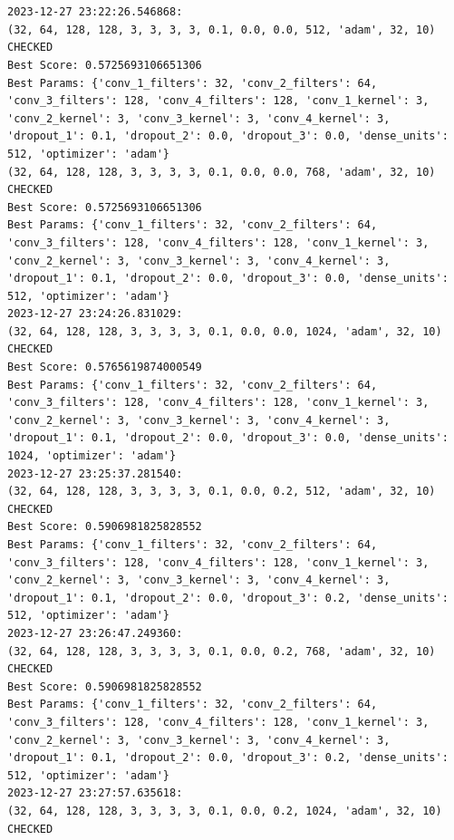 
\section{}
\label{app:appendix-a}

\begin{verbatim}
2023-12-27 23:22:26.546868:
(32, 64, 128, 128, 3, 3, 3, 3, 0.1, 0.0, 0.0, 512, 'adam', 32, 10) CHECKED
Best Score: 0.5725693106651306
Best Params: {'conv_1_filters': 32, 'conv_2_filters': 64, 'conv_3_filters': 128, 'conv_4_filters': 128, 'conv_1_kernel': 3, 'conv_2_kernel': 3, 'conv_3_kernel': 3, 'conv_4_kernel': 3, 'dropout_1': 0.1, 'dropout_2': 0.0, 'dropout_3': 0.0, 'dense_units': 512, 'optimizer': 'adam'}
(32, 64, 128, 128, 3, 3, 3, 3, 0.1, 0.0, 0.0, 768, 'adam', 32, 10) CHECKED
Best Score: 0.5725693106651306
Best Params: {'conv_1_filters': 32, 'conv_2_filters': 64, 'conv_3_filters': 128, 'conv_4_filters': 128, 'conv_1_kernel': 3, 'conv_2_kernel': 3, 'conv_3_kernel': 3, 'conv_4_kernel': 3, 'dropout_1': 0.1, 'dropout_2': 0.0, 'dropout_3': 0.0, 'dense_units': 512, 'optimizer': 'adam'}
2023-12-27 23:24:26.831029:
(32, 64, 128, 128, 3, 3, 3, 3, 0.1, 0.0, 0.0, 1024, 'adam', 32, 10) CHECKED
Best Score: 0.5765619874000549
Best Params: {'conv_1_filters': 32, 'conv_2_filters': 64, 'conv_3_filters': 128, 'conv_4_filters': 128, 'conv_1_kernel': 3, 'conv_2_kernel': 3, 'conv_3_kernel': 3, 'conv_4_kernel': 3, 'dropout_1': 0.1, 'dropout_2': 0.0, 'dropout_3': 0.0, 'dense_units': 1024, 'optimizer': 'adam'}
2023-12-27 23:25:37.281540:
(32, 64, 128, 128, 3, 3, 3, 3, 0.1, 0.0, 0.2, 512, 'adam', 32, 10) CHECKED
Best Score: 0.5906981825828552
Best Params: {'conv_1_filters': 32, 'conv_2_filters': 64, 'conv_3_filters': 128, 'conv_4_filters': 128, 'conv_1_kernel': 3, 'conv_2_kernel': 3, 'conv_3_kernel': 3, 'conv_4_kernel': 3, 'dropout_1': 0.1, 'dropout_2': 0.0, 'dropout_3': 0.2, 'dense_units': 512, 'optimizer': 'adam'}
2023-12-27 23:26:47.249360: 
(32, 64, 128, 128, 3, 3, 3, 3, 0.1, 0.0, 0.2, 768, 'adam', 32, 10) CHECKED
Best Score: 0.5906981825828552
Best Params: {'conv_1_filters': 32, 'conv_2_filters': 64, 'conv_3_filters': 128, 'conv_4_filters': 128, 'conv_1_kernel': 3, 'conv_2_kernel': 3, 'conv_3_kernel': 3, 'conv_4_kernel': 3, 'dropout_1': 0.1, 'dropout_2': 0.0, 'dropout_3': 0.2, 'dense_units': 512, 'optimizer': 'adam'}
2023-12-27 23:27:57.635618: 
(32, 64, 128, 128, 3, 3, 3, 3, 0.1, 0.0, 0.2, 1024, 'adam', 32, 10) CHECKED

\end{verbatim}
